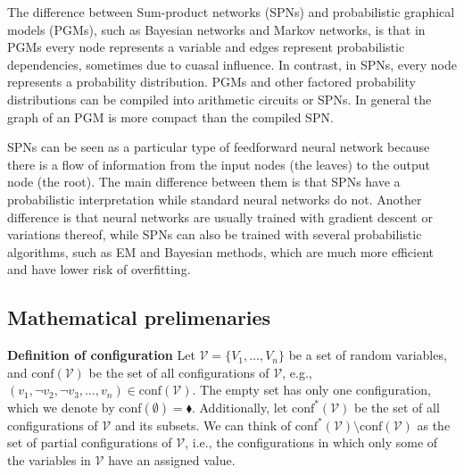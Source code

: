 \documentclass{article}
\begin{document}
The difference between Sum-product networks (SPNs) and probabilistic graphical models (PGMs), such as Bayesian networks and Markov networks, is that in PGMs every node represents a variable and edges represent probabilistic dependencies, sometimes due to cuasal influence. In contrast, in SPNs, every node represents a probability distribution. PGMs and other factored probability distributions can be compiled into arithmetic circuits or SPNs. In general the graph of an PGM is more compact than the compiled SPN.  

SPNs can be seen as a particular type of feedforward neural network because there is a flow of information from the input nodes (the leaves) to the output node (the root). The main difference between them is that SPNs have a probabilistic interpretation while standard neural networks do not. Another difference is that neural networks are usually trained with gradient descent or variations thereof, while SPNs can also be trained with several probabilistic algorithms, such as EM and Bayesian methods, which are much more efficient and have lower risk of overfitting. 

\subsection{Mathematical prelimenaries}

\begin{theorem}
    \textbf{Definition of configuration} Let $\mathcal{V} = \{V_1, \dots, V_n\}$ be a set of random variables, and $\text{conf}(\mathcal{V})$ be the set of all configurations of $\mathcal{V}$, e.g., $(v_1, \neg v_2, \neg v_3, \dots, v_n) \in \text{conf}(\mathcal{V})$. The empty set has only one configuration, which we denote by conf$(\emptyset) = \blacklozenge$. Additionally, let $\text{conf}^*(\mathcal{V})$ be the set of all configurations of $\mathcal{V}$ and its subsets. We can think of $\text{conf}^*(\mathcal{V}) \text{\textbackslash} \text{conf}(\mathcal{V})$ as the set of partial configurations of $\mathcal{V}$, i.e., the configurations in which only some of the variables in $\mathcal{V}$ have an assigned value.
\end{theorem}
\end{document}
